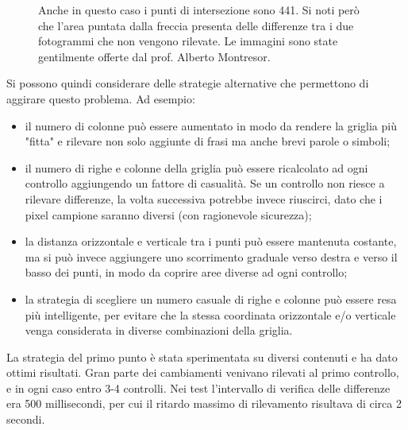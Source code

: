 \begin{figure}[htbp]
\begin{subfigure}[t]{0.5\textwidth}
	\end{subfigure}
	
	\caption{Anche in questo caso i punti di intersezione sono 441. Si noti però che l'area puntata dalla freccia presenta delle differenze tra i due fotogrammi che non vengono rilevate. Le immagini sono state gentilmente offerte dal prof. Alberto Montresor.}
	\label{fig:diff_slide2}
\end{figure}

Si possono quindi considerare delle strategie alternative che permettono di aggirare questo problema. Ad esempio:

\begin{itemize}
	\item il numero di colonne può essere aumentato in modo da rendere la griglia più "fitta" e rilevare non solo aggiunte di frasi ma anche brevi parole o simboli;
	\item il numero di righe e colonne della griglia può essere ricalcolato ad ogni controllo aggiungendo un fattore di casualità. Se un controllo non riesce a rilevare differenze, la volta successiva potrebbe invece riuscirci, dato che i pixel campione saranno diversi (con ragionevole sicurezza);
	\item la distanza orizzontale e verticale tra i punti può essere mantenuta costante, ma si può invece aggiungere uno scorrimento graduale verso destra e verso il basso dei punti, in modo da coprire aree diverse ad ogni controllo;
	\item la strategia di scegliere un numero casuale di righe e colonne può essere resa più intelligente, per evitare che la stessa coordinata orizzontale e/o verticale venga considerata in diverse combinazioni della griglia.
\end{itemize}

La strategia del primo punto è stata sperimentata su diversi contenuti e ha dato ottimi risultati. Gran parte dei cambiamenti venivano rilevati al primo controllo, e in ogni caso entro 3-4 controlli. Nei test l'intervallo di verifica delle differenze era 500 millisecondi, per cui il ritardo massimo di rilevamento risultava di circa 2 secondi.

